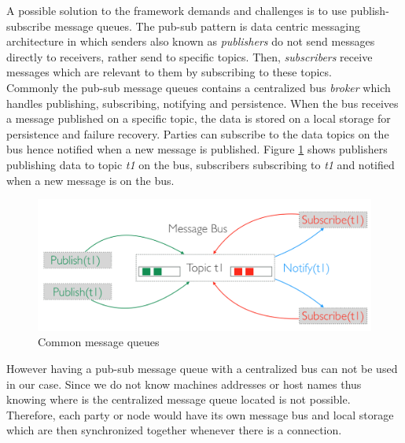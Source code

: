  

\noindent A possible solution to the framework demands and challenges is to use publish-subscribe message queues. The pub-sub pattern is data centric messaging architecture in which senders also known as \textit{publishers} do not send messages directly to receivers, rather send to specific topics. Then, \textit{subscribers} receive messages which are relevant to them by subscribing to these topics. \\


\noindent Commonly the pub-sub message queues contains a centralized bus \textit{broker} which handles publishing, subscribing, notifying and persistence. 
When the bus receives a message published on a specific topic, the data is stored on a local storage for persistence and failure recovery. 
Parties can subscribe to the data topics on the  bus hence notified when a new message is published. Figure \ref{fig:message-queues} shows  publishers publishing data to topic \textit{t1} on the bus, subscribers subscribing to \textit{t1} and notified when a new message is on the bus.
	
\begin{figure}[H]
	\centering
	\includegraphics[scale=0.3]{images/message-queues.png}
	\caption{Common message queues}
	\label{fig:message-queues}
\end{figure}

\noindent However having a pub-sub message queue with a centralized bus can not be used in our case. Since we do not know machines addresses or host names thus knowing where is the centralized message queue located is not possible. Therefore, each party or node would have its own message bus and local storage which are then synchronized together whenever there is a connection.


